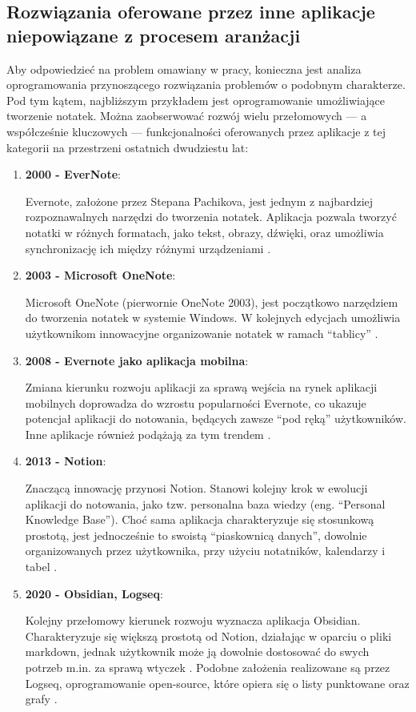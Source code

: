 \subsection{Rozwiązania oferowane przez inne aplikacje niepowiązane z procesem aranżacji}
Aby odpowiedzieć na problem omawiany w pracy, konieczna jest analiza oprogramowania przynoszącego rozwiązania problemów
o podobnym charakterze. Pod tym kątem, najbliższym przykładem jest oprogramowanie umożliwiające
tworzenie notatek. Można zaobserwować rozwój wielu przełomowych — a współcześnie kluczowych — funkcjonalności oferowanych
przez aplikacje z tej kategorii na przestrzeni ostatnich dwudziestu lat:
\begin{enumerate}
	\item \textbf{2000 - EverNote}:

	      Evernote, założone przez Stepana Pachikova, jest jednym z najbardziej rozpoznawalnych narzędzi do tworzenia
	      notatek. Aplikacja pozwala tworzyć notatki w różnych formatach, jako tekst, obrazy, dźwięki,
	      oraz umożliwia synchronizację ich między różnymi urządzeniami \cite{evernote}.
	\item \textbf{2003 - Microsoft OneNote}:

	      Microsoft OneNote (pierwornie OneNote 2003), jest początkowo narzędziem do tworzenia notatek w systemie
	      Windows. W kolejnych edycjach umożliwia użytkownikom innowacyjne organizowanie notatek w ramach \enquote{tablicy} \cite{onenote}.
	\item \textbf{2008 - Evernote jako aplikacja mobilna}:

	      Zmiana kierunku rozwoju aplikacji za sprawą wejścia na rynek aplikacji mobilnych doprowadza do wzrostu
	      popularności Evernote,
	      co ukazuje potencjał aplikacji do notowania, będących zawsze \enquote{pod ręką} użytkowników.
	      Inne aplikacje również podążają za tym trendem \cite{evernote}.
	\item \textbf{2013 - Notion}:

	      Znaczącą innowację przynosi Notion. Stanowi kolejny krok w ewolucji aplikacji do notowania, jako tzw. personalna
	      baza wiedzy (eng. \enquote{Personal Knowledge Base}).
	      Choć sama aplikacja charakteryzuje się stosunkową prostotą, jest jednocześnie to swoistą \enquote{piaskownicą danych},
	      dowolnie organizowanych przez użytkownika, przy użyciu notatników, kalendarzy i tabel \cite{notion}.
	\item \textbf{2020 - Obsidian, Logseq}:

	      Kolejny przełomowy kierunek rozwoju wyznacza aplikacja Obsidian. Charakteryzuje się większą prostotą od Notion,
	      działając w oparciu o pliki markdown, jednak użytkownik może ją dowolnie dostosować do swych potrzeb m.in.
	      za sprawą wtyczek \cite{obsidian}.
	      Podobne założenia realizowane są przez Logseq,
	      oprogramowanie open-source, które opiera się o listy punktowane oraz grafy \cite{logseq}.
\end{enumerate}
